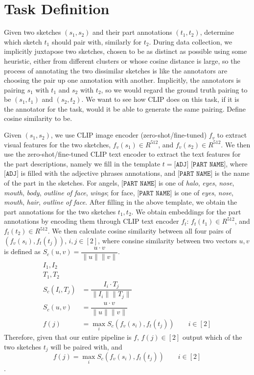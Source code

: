 \section{Task Definition}
Given two sketches $(s_1,s_2)$ and their part annotations $(t_1,t_2)$, determine which sketch $t_1$ should pair with, similarly for $t_2$. 
During data collection, we implicitly juxtapose two sketches, chosen to be as distinct as possible using some heuristic, either from different clusters or whose cosine distance is large, so the process of annotating the two dissimilar sketches is like the annotators are choosing the pair up one annotation with another. Implicitly, the annotators is pairing $s_1$ with $t_1$ and $s_2$ with $t_2$, so we would regard the ground truth pairing to be $(s_1,t_1)$ and $(s_2,t_2)$. We want to see how CLIP does on this task, if it is the annotator for the task, would it be able to generate the same pairing. Define cosine similarity to be.  



Given $(s_1,s_2)$, we use CLIP image encoder (zero-shot/fine-tuned) $f_v$ to extract visual features for the two sketches,  $f_v(s_1) \in {R}^{512}$, and $f_v(s_2) \in {R}^{512}$. We then use the zero-shot/fine-tuned CLIP text encoder to extract the text features for the part descriptions, namely we fill in the template $t = \texttt{[ADJ] [PART NAME]}$, where $\texttt{[ADJ]}$ is filled with the adjective phrases annotations, and $\texttt{[PART NAME]}$ is the name of the part in the sketches. For angels, $\texttt{[PART NAME]}$ is one of \textit{halo}, \textit{eyes}, \textit{nose}, \textit{mouth}, \textit{body}, \textit{outline of face}, \textit{wings}; for face, $\texttt{[PART NAME]}$ is one of \textit{eyes}, \textit{nose}, \textit{mouth}, \textit{hair}, \textit{outline of face}. After filling in the above template, we obtain the part annotations for the two sketches $t_1,t_2$.  
We obtain embeddings for the part annotations by encoding them through CLIP text encoder $f_t$: $f_t(t_1) \in {R}^{512}$, and $f_t(t_2) \in {R}^{512}$. We then calculate cosine similarity between all four pairs of $(f_v(s_i), f_t(t_j))$, $i,j \in [2]$, where consine similarity between two vectors $u,v$ is defined as $S_c(u,v) = \dfrac{u \cdot v}{\|u\| \|v\|}$. 
\begin{equation}
    \begin{split}
        I_1, I_2 \\
        T_1, T_2 \\
        S_c(I_i,T_j) & = \dfrac{I_i \cdot T_j}{\|I_i\| \|T_j\|} \\
        S_c(u,v) & = \dfrac{u \cdot v}{\|u\| \|v\|} \\
        f(j) & = \max_{i} S_c(f_v(s_i), f_t(t_j)) \hspace{2em} i \in [2]
    \end{split}
\end{equation}
Therefore, given that our entire pipeline is $f$, $f(j) \in [2]$ output which of the two sketches $t_j$ will be paired with, and $$f(j) = \max_{i} S_c(f_v(s_i), f_t(t_j)) \hspace{2em} i \in [2]$$.    

